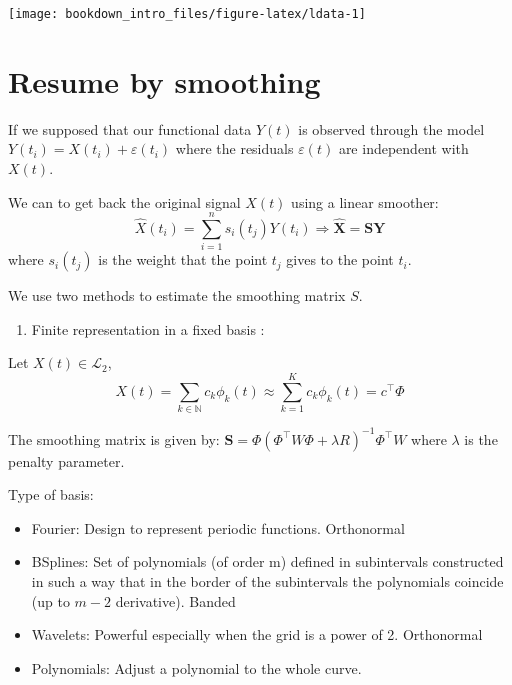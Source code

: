 \documentclass[
]{book}
\newenvironment{Shaded}{\begin{snugshade}}{\end{snugshade}}
\newcommand{\AttributeTok}[1]{\textcolor[rgb]{0.77,0.63,0.00}{#1}}
\newcommand{\FunctionTok}[1]{\textcolor[rgb]{0.00,0.00,0.00}{#1}}
\newcommand{\NormalTok}[1]{#1}
\newcommand{\OtherTok}[1]{\textcolor[rgb]{0.56,0.35,0.01}{#1}}
\newcommand{\SpecialCharTok}[1]{\textcolor[rgb]{0.00,0.00,0.00}{#1}}
\providecommand{\tightlist}{%
  \setlength{\itemsep}{0pt}\setlength{\parskip}{0pt}}
\begin{document}
\begin{Shaded}
\end{Shaded}

\begin{center}\texttt{[image: bookdown\_intro\_files/figure-latex/ldata-1]} \end{center}

\hypertarget{resume-by-smoothing}{%
\section{Resume by smoothing}\label{resume-by-smoothing}}

If we supposed that our functional data \(Y(t)\) is observed through the model \(Y(t_i)=X(t_i)+\varepsilon(t_i)\)
where the residuals \(\varepsilon(t)\) are independent with \(X(t)\).

We can to get back the original signal \(X(t)\) using a linear smoother:
\[\hat{X}(t_i)=\sum_{i=1}^{n} s_{i}(t_j)Y(t_i)  \Rightarrow \mathbf{\hat{X}}=\mathbf{S}\mathbf{Y} \]
where \(s_{i}(t_j)\) is the weight that the point \(t_j\) gives to the point \(t_i\).

We use two methods to estimate the smoothing matrix \(S\).

\begin{enumerate}
\def\labelenumi{\arabic{enumi}.}
\tightlist
\item
  Finite representation in a fixed basis \citep{Ramsay2005}:
\end{enumerate}

Let \(X(t)\in \mathcal{L}_2\),
\[ X(t)= \sum_{k\in\mathbb{N}}{c_k\phi_k(t)}\approx\sum_{k=1}^K c_k\phi_k(t)=c^{\top}\Phi\]

The smoothing matrix is given by: \(\mathbf{S}=\Phi(\Phi^{\top}W\Phi+\lambda R)^{-1}\Phi^{\top}W\) where \(\lambda\) is the penalty parameter.

Type of basis:

\begin{itemize}
\item
  Fourier: Design to represent periodic functions. Orthonormal
\item
  BSplines: Set of polynomials (of order m) defined in subintervals constructed in such a way that in the border of the subintervals the polynomials coincide (up to \(m - 2\) derivative). Banded
\item
  Wavelets: Powerful especially when the grid is a power of 2. Orthonormal
\item
  Polynomials: Adjust a polynomial to the whole curve.
\end{itemize}
\end{document}
